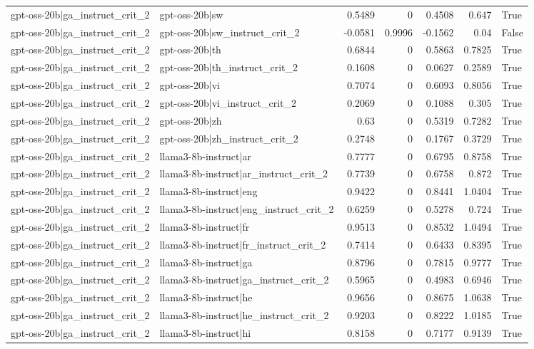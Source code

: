 \begin{table}
\begin{tabular}{l l r r r r l}
gpt-oss-20b|ga_instruct_crit_2 & gpt-oss-20b|sw & 0.5489 & 0 & 0.4508 & 0.647 & True \\
gpt-oss-20b|ga_instruct_crit_2 & gpt-oss-20b|sw_instruct_crit_2 & -0.0581 & 0.9996 & -0.1562 & 0.04 & False \\
gpt-oss-20b|ga_instruct_crit_2 & gpt-oss-20b|th & 0.6844 & 0 & 0.5863 & 0.7825 & True \\
gpt-oss-20b|ga_instruct_crit_2 & gpt-oss-20b|th_instruct_crit_2 & 0.1608 & 0 & 0.0627 & 0.2589 & True \\
gpt-oss-20b|ga_instruct_crit_2 & gpt-oss-20b|vi & 0.7074 & 0 & 0.6093 & 0.8056 & True \\
gpt-oss-20b|ga_instruct_crit_2 & gpt-oss-20b|vi_instruct_crit_2 & 0.2069 & 0 & 0.1088 & 0.305 & True \\
gpt-oss-20b|ga_instruct_crit_2 & gpt-oss-20b|zh & 0.63 & 0 & 0.5319 & 0.7282 & True \\
gpt-oss-20b|ga_instruct_crit_2 & gpt-oss-20b|zh_instruct_crit_2 & 0.2748 & 0 & 0.1767 & 0.3729 & True \\
gpt-oss-20b|ga_instruct_crit_2 & llama3-8b-instruct|ar & 0.7777 & 0 & 0.6795 & 0.8758 & True \\
gpt-oss-20b|ga_instruct_crit_2 & llama3-8b-instruct|ar_instruct_crit_2 & 0.7739 & 0 & 0.6758 & 0.872 & True \\
gpt-oss-20b|ga_instruct_crit_2 & llama3-8b-instruct|eng & 0.9422 & 0 & 0.8441 & 1.0404 & True \\
gpt-oss-20b|ga_instruct_crit_2 & llama3-8b-instruct|eng_instruct_crit_2 & 0.6259 & 0 & 0.5278 & 0.724 & True \\
gpt-oss-20b|ga_instruct_crit_2 & llama3-8b-instruct|fr & 0.9513 & 0 & 0.8532 & 1.0494 & True \\
gpt-oss-20b|ga_instruct_crit_2 & llama3-8b-instruct|fr_instruct_crit_2 & 0.7414 & 0 & 0.6433 & 0.8395 & True \\
gpt-oss-20b|ga_instruct_crit_2 & llama3-8b-instruct|ga & 0.8796 & 0 & 0.7815 & 0.9777 & True \\
gpt-oss-20b|ga_instruct_crit_2 & llama3-8b-instruct|ga_instruct_crit_2 & 0.5965 & 0 & 0.4983 & 0.6946 & True \\
gpt-oss-20b|ga_instruct_crit_2 & llama3-8b-instruct|he & 0.9656 & 0 & 0.8675 & 1.0638 & True \\
gpt-oss-20b|ga_instruct_crit_2 & llama3-8b-instruct|he_instruct_crit_2 & 0.9203 & 0 & 0.8222 & 1.0185 & True \\
gpt-oss-20b|ga_instruct_crit_2 & llama3-8b-instruct|hi & 0.8158 & 0 & 0.7177 & 0.9139 & True \\

\end{tabular}
\end{table}
